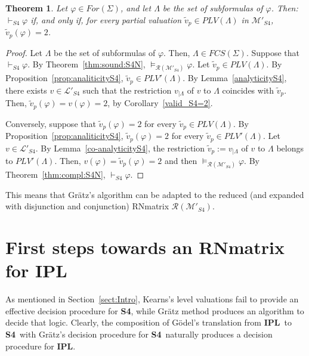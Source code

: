 \documentclass[12pt]{article}
\newtheorem{theorem}{Theorem}[section]
\newtheorem{corollary}{Corollary}[theorem]
\newcommand{\ipl}{\ensuremath{\mathbf{IPL}}}
\newcommand{\sfo}{\textbf{S4}}
\begin{document}
\begin{theorem} \label{Theor:sound_compl_S4-2} Let $\varphi \in For(\Sigma)$, and let $\Lambda$ be the set of subformulas of $\varphi$. Then: $\vdash_{S4} \varphi$ if, and only if, for every partial valuation $\tilde v_p \in PLV(\Lambda)$ in $\mathcal{M}'_{S4}$,  $\tilde v_p(\varphi)=2$.
\end{theorem}
\begin{proof} Let $\Lambda$ be the set of subformulas of $\varphi$. Then, $\Lambda \in FCS(\Sigma)$.
Suppose that $\vdash_{S4} \varphi$. By Theorem~\ref{thm:sound:S4N}, $\models_{\mathcal{R}(\mathcal{M}'_{S4})} \varphi$. 
Let $\tilde v_p \in PLV(\Lambda)$. By Proposition~\ref{prop:analiticityS4}, $\tilde v_p \in PLV'(\Lambda)$. By Lemma~\ref{analyticityS4},  there exists $v \in \mathcal{L}'_{S4}$ such that the restriction $v_{|\Lambda}$ of $v$ to $\Lambda$ coincides with $\tilde v_p$. Then, $\tilde v_p(\varphi)=v(\varphi)=2$, by Corollary~\ref{valid_S4=2}.

Conversely, suppose that  $\tilde v_p(\varphi)=2$ for every  $\tilde v_p \in PLV(\Lambda)$. By Proposition~\ref{prop:analiticityS4},  $\tilde v_p(\varphi)=2$ for every  $\tilde v_p \in PLV'(\Lambda)$. Let $v \in \mathcal{L}'_{S4}$. By Lemma~\ref{co-analyticityS4}, the restriction $\tilde v_p:=v_{|\Lambda}$ of $v$ to $\Lambda$ belongs to $PLV'(\Lambda)$. Then, $v(\varphi)=\tilde v_p(\varphi)=2$ and then $\models_{\mathcal{R}(\mathcal{M}'_{S4})} \varphi$. By Theorem~\ref{thm:compl:S4N}, $\vdash_{S4} \varphi$.
\end{proof}


This means that Gr\"atz's algorithm can be adapted to the reduced (and expanded with disjunction and conjunction)  RNmatrix $\mathcal{R}(\mathcal{M}'_{S4})$.



\section{First steps towards an RNmatrix  for \ipl}\label{Sect:IPLfirstStep}

As mentioned in Section~\ref{sect:Intro}, Kearns's level valuations fail to provide an effective decision procedure for \sfo, while Gr\"atz method produces an algorithm to decide that logic. Clearly, the composition of  G\"odel's translation from \ipl\ to \sfo\ with Gr\"atz's decision procedure for \sfo\ naturally produces a decision procedure for \ipl. 
\end{document}
